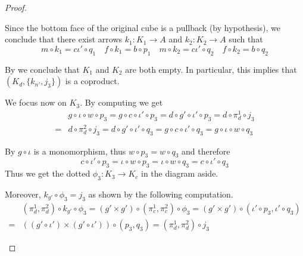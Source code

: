 \documentclass[a4paper,UKenglish,cleveref,pdftex,thm-restate,numberwithinsect]{lipics-v2021}
\def\E{\textbf {\textup{E}}}
\newcommand{\commentato}[1]{ {} }
\newcommand{\id}[1]{\mathsf{id}_{#1}}
\begin{document}
\begin{proof}
\begin{enumerate}
Since the bottom face of the original cube is a pullback (by hypothesis), we conclude that there exist arrows $k_1\colon  K_1\to A$ and $k_2\colon K_2\to A$ such that
\[m\circ k_1= c \iota'\circ q_1 \quad f\circ k_1=b\circ p_1 \quad m\circ k_2=c \iota'\circ q_2 \quad f\circ k_2=b\circ q_2\]

By  we conclude that $K_1$ and $K_2$
are both empty. In particular, this implies that $(K_d, \{k_{n'}, j_3\})$ is a coproduct.


We focus now on $K_3$. By computing we get
	\begin{align*}
	&g\circ \iota \circ w\circ p_3=g\circ c\circ \iota'\circ p_3=d\circ g'\circ \iota'\circ p_3=d\circ \pi^1_d\circ j_3\\=&d\circ \pi^2_d\circ j_3=d\circ g'\circ \iota' \circ q_3=g\circ c\circ \iota'\circ q_3=g\circ \iota \circ w\circ q_3
	\end{align*}

\noindent 
\parbox{3cm}{}\hfill\parbox{9.5cm}{By  $g\circ \iota$ is a monomorphism, thus $w\circ p_3=w\circ q_3$ and therefore
\[c\circ \iota'\circ p_3=\iota\circ w\circ p_3=\iota \circ w\circ q_3=c\circ \iota'\circ q_3\]
Thus we get the dotted $\phi_3\colon K_3\to K_c$ in the diagram aside.}

Moreover, $k_{g'}\circ \phi_3=j_3$ as shown by the following computation.
\begin{align*}
&(\pi^1_d, \pi^2_d)\circ k_{g'}\circ \phi_3=(g'\times g')\circ (\pi^1_c, \pi^2_c)\circ \phi_3=(g'\times g')\circ (\iota'\circ p_3, \iota'\circ q_3)\\=&((g'\circ \iota') \times (g'\circ \iota'))\circ (p_3, q_3)=(\pi^1_d, \pi^2_d)\circ j_3
\end{align*}
 
 \commentato{ 
 
 	\smallskip
 \parbox{7.5cm}{We can go further. The outer part of the diagram on the right commutes, so that we have the dotted $\psi_0\circ K_b\to K_0$.
 Now, on the one hand $\phi_0\circ \psi_0=\id{K_b}$ because if we compute we get
  \[(\pi^1_b, \pi^2_b)\circ \phi_0\circ \psi_0=(p_0, q_0)\circ \psi_0=(\pi^1_b, \pi^2_b)\]}\hfill \parbox{4cm}{\vspace{-.5cm}\xymatrix{K_b \ar[dr]_{(\pi^1_b, \pi^2_b)}  \ar@{>->}@/^.4cm/[rr]^{k_{n'}} \ar@{.>}[r]_{\psi_0}& K_0 \ar@{>->}[r]_{j_0}  \ar[d]^{(p_0, q_0)}& K_d   \ar[d]^{(\pi^1_d, \pi^2_d)} \\
 	& B'\times B' \ar@{>->}[r]_-{n'\times n'} & D'\times D' }
 	}

}
\end{enumerate}
\end{proof}
\end{document}
